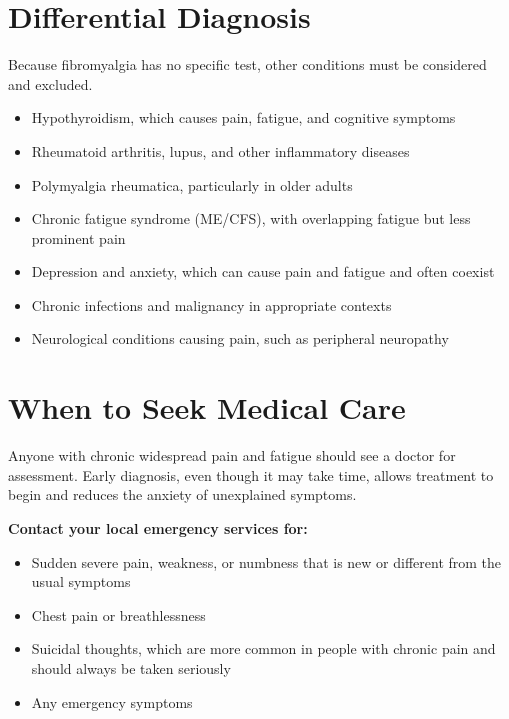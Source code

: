 \section*{Differential Diagnosis}
Because fibromyalgia has no specific test, other conditions must be considered and excluded.
\begin{itemize}
    \item Hypothyroidism, which causes pain, fatigue, and cognitive symptoms
    \item Rheumatoid arthritis, lupus, and other inflammatory diseases
    \item Polymyalgia rheumatica, particularly in older adults
    \item Chronic fatigue syndrome (ME/CFS), with overlapping fatigue but less prominent pain
    \item Depression and anxiety, which can cause pain and fatigue and often coexist
    \item Chronic infections and malignancy in appropriate contexts
    \item Neurological conditions causing pain, such as peripheral neuropathy
\end{itemize}

\section*{When to Seek Medical Care}
Anyone with chronic widespread pain and fatigue should see a doctor for assessment. Early diagnosis, even though it may take time, allows treatment to begin and reduces the anxiety of unexplained symptoms.

\textbf{Contact your local emergency services for:}
\begin{itemize}
    \item Sudden severe pain, weakness, or numbness that is new or different from the usual symptoms
    \item Chest pain or breathlessness
    \item Suicidal thoughts, which are more common in people with chronic pain and should always be taken seriously
    \item Any emergency symptoms
\end{itemize}

